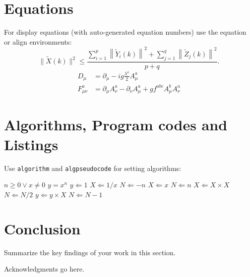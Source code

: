 \documentclass[twocolumn]{svjour3}          %
\begin{document}
\section{Equations}\label{sec4}
For display equations (with auto-generated equation numbers) use the equation or align environments:
\begin{equation}
\|\tilde{X}(k)\|^2 \leq\frac{\sum\limits_{i=1}^{p}\left\|\tilde{Y}_i(k)\right\|^2+\sum\limits_{j=1}^{q}\left\|\tilde{Z}_j(k)\right\|^2 }{p+q}.\label{eq1}
\end{equation}
\begin{align}
D_\mu &=  \partial_\mu - ig \frac{\lambda^a}{2} A^a_\mu \nonumber \\
F^a_{\mu\nu} &= \partial_\mu A^a_\nu - \partial_\nu A^a_\mu + g f^{abc} A^b_\mu A^a_\nu \label{eq2}
\end{align}

\section{Algorithms, Program codes and Listings}\label{sec7}
Use \verb+algorithm+ and \verb+algpseudocode+ for setting algorithms:

\begin{algorithm}
\caption{Calculate $y = x^n$}\label{algo1}
\begin{algorithmic}[1]
\Require $n \geq 0 \vee x \neq 0$
\Ensure $y = x^n$ 
\State $y \Leftarrow 1$
    \State $X \Leftarrow 1 / x$
    \State $N \Leftarrow -n$
\Else
    \State $X \Leftarrow x$
    \State $N \Leftarrow n$
\EndIf
{}
        \State $X \Leftarrow X \times X$
        \State $N \Leftarrow N / 2$
    \Else
        \State $y \Leftarrow y \times X$
        \State $N \Leftarrow N - 1$
    \EndIf
\EndWhile
\end{algorithmic}
\end{algorithm}

\section{Conclusion}
\label{conclusion}
Summarize the key findings of your work in this section.
\lipsum[9]

\begin{acknowledgements}
Acknowledgments go here.
\end{acknowledgements}


\end{document}
